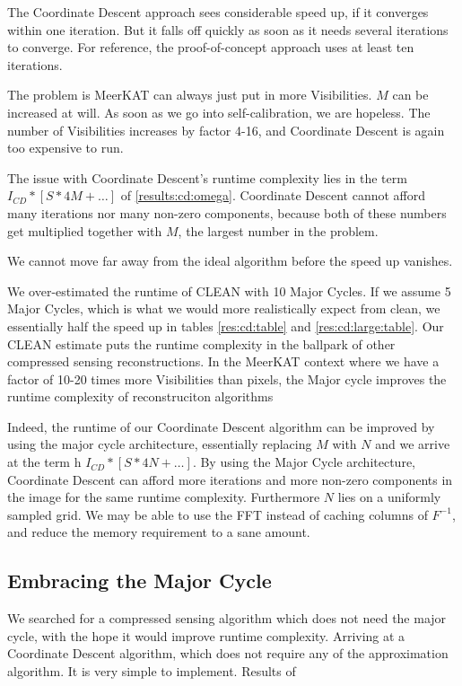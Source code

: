 The Coordinate Descent approach sees considerable speed up, if it converges within one iteration. But it falls off quickly as soon as it needs several iterations to converge. For reference, the proof-of-concept approach uses at least ten iterations. 

The problem is MeerKAT can always just put in more Visibilities. $M$ can be increased at will. As soon as we go into self-calibration, we are hopeless. The number of Visibilities increases by factor 4-16, and Coordinate Descent is again too expensive to run.

The issue with Coordinate Descent's runtime complexity lies in the term $I_{CD} * [S * 4M +\ldots]$ of \eqref{results:cd:omega}. Coordinate Descent cannot afford many iterations nor many non-zero components, because both of these numbers get multiplied together with $M$, the largest number in the problem.

We cannot move far away from the ideal algorithm before the speed up vanishes. 

We over-estimated the runtime of CLEAN with 10 Major Cycles. If we assume 5 Major Cycles, which is what we would more realistically expect from clean, we essentially half the speed up in tables \ref{res:cd:table} and \ref{res:cd:large:table}. Our CLEAN estimate puts the runtime complexity in the ballpark of other compressed sensing reconstructions.
In the MeerKAT context where we have a factor of 10-20 times more Visibilities than pixels, the Major cycle improves the runtime complexity of reconstruciton algorithms

Indeed, the runtime of our Coordinate Descent algorithm can be improved by using the major cycle architecture, essentially replacing $M$ with $N$ and we arrive at the term
h $I_{CD} * [S * 4N +\ldots]$. By using the Major Cycle architecture, Coordinate Descent can afford more iterations and more non-zero components in the image for the same runtime complexity. Furthermore $N$ lies on a uniformly sampled grid. We may be able to use the FFT instead of caching columns of $F^{-1}$, and reduce the memory requirement to a sane amount.


\subsection{Embracing the Major Cycle}
We searched for a compressed sensing algorithm which does not need the major cycle, with the hope it would improve runtime complexity. Arriving at a Coordinate Descent algorithm, which does not require any of the approximation algorithm. It is very simple to implement. Results of 

